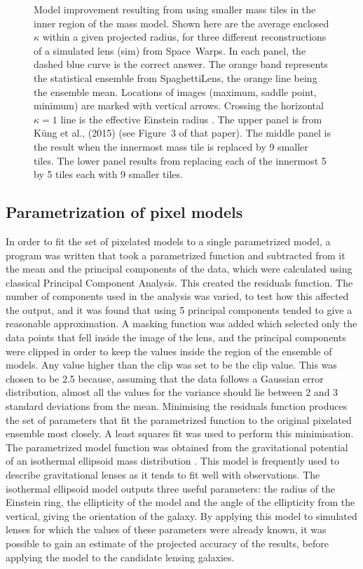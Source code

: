 \begin{figure}
  \caption{Model improvement resulting from using smaller mass tiles
    in the inner region of the mass model.  Shown here are the average
    enclosed $\kappa$ within a given projected radius, for three
    different reconstructions of a simulated lens (sim) from
    Space~Warps.  In each panel, the dashed blue curve is the correct
    answer.  The orange band represents the statistical ensemble from
    SpaghettiLens, the orange line being the ensemble mean.  Locations of
    images (maximum, saddle point, minimum) are marked with vertical
    arrows.  Crossing the horizontal $\kappa=1$ line is the effective
    Einstein radius \ER. The upper panel is from
    K\"ung et al., (2015) (see Figure~3 of that paper).  The middle
    panel is the result when the innermost mass tile is replaced by 9
    smaller tiles.  The lower panel results from replacing each of the
    innermost 5 by 5 tiles each with 9 smaller tiles.}
  \label{fig:subsampling}
\end{figure}

\subsection{Parametrization of pixel models} \label{subsec:parameter}

In order to fit the set of pixelated models to a single parametrized model, a 
program was written that took a parametrized function and subtracted from it 
the mean and the principal components of the data, which were calculated using 
classical Principal Component Analysis.
This created the residuals function.
The number of components used in the analysis was varied, to test how this 
affected the output, and it was found that using 5 principal components tended 
to give a reasonable approximation.
A masking function was added which selected only the data points that fell 
inside the image of the lens, and the principal components were clipped in 
order to keep the values inside the region of the ensemble of models.
Any value higher than the clip was set to be the clip value.
This was chosen to be 2.5 because, assuming that the data follows a Gaussian error 
distribution, almost all the values for the variance should lie between 2 and 3 
standard deviations from the mean.
Minimising the residuals function produces the set of parameters that fit the 
parametrized function to the original pixelated ensemble most closely.
A least squares fit was used to perform this minimisation.
The parametrized model function was obtained from the gravitational potential 
of an isothermal ellipsoid mass distribution \citep{2001astro.ph..2341K}.
This model is frequently used to describe gravitational lenses as it tends to 
fit well with observations.
The isothermal ellipsoid model outputs three useful parameters: the radius of 
the Einstein ring, the ellipticity of the model and the angle of the 
ellipticity from the vertical, giving the orientation of the galaxy.
By applying this model to simulated lenses for which the values of these 
parameters were already known, it was possible to gain an estimate of the 
projected accuracy of the results, before applying the model to the candidate 
lensing galaxies.


